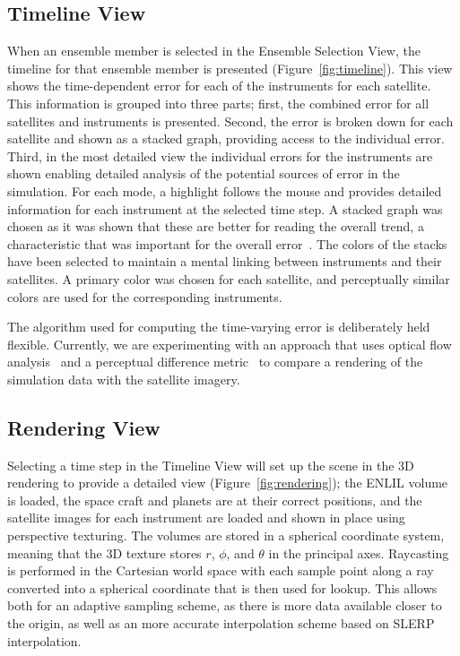 \documentclass{vgtc}                          %
\begin{document}
\subsection{Timeline View} \label{sec:timeline}
When an ensemble member is selected in the Ensemble Selection View, the timeline for that ensemble member is presented (Figure~\ref{fig:timeline}). This view shows the time-dependent error for each of the instruments for each satellite. This information is grouped into three parts; first, the combined error for all satellites and instruments is presented. Second, the error is broken down for each satellite and shown as a stacked graph, providing access to the individual error. Third, in the most detailed view the individual errors for the instruments are shown enabling detailed analysis of the potential sources of error in the simulation. For each mode, a highlight follows the mouse and provides detailed information for each instrument at the selected time step. A stacked graph was chosen as it was shown that these are better for reading the overall trend, a characteristic that was important for the overall error~\cite{byron2008stacked}. The colors of the stacks have been selected to maintain a mental linking between instruments and their satellites. A primary color was chosen for each satellite, and perceptually similar colors are used for the corresponding instruments.

The algorithm used for computing the time-varying error is deliberately held flexible. Currently, we are experimenting with an approach that uses optical flow analysis~\cite{sun2010secrets} and a perceptual difference metric~\cite{yee2004perceptual} to compare a rendering of the simulation data with the satellite imagery.

\subsection{Rendering View} \label{sec:rendering}
Selecting a time step in the Timeline View will set up the scene in the 3D rendering to provide a detailed view (Figure~\ref{fig:rendering}); the ENLIL volume is loaded, the space craft and planets are at their correct positions, and the satellite images for each instrument are loaded and shown in place using perspective texturing. The volumes are stored in a spherical coordinate system, meaning that the 3D texture stores $r$, $\phi$, and $\theta$ in the principal axes. Raycasting is performed in the Cartesian world space with each sample point along a ray converted into a spherical coordinate that is then used for lookup. This allows both for an adaptive sampling scheme, as there is more data available closer to the origin, as well as an more accurate interpolation scheme based on SLERP interpolation.



\end{document}
